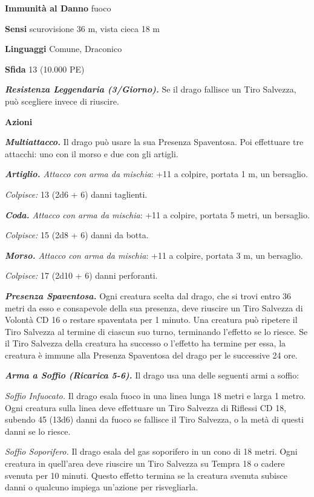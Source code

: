 \begin{multicols}{2}
\textbf{Immunità al Danno} fuoco

\textbf{Sensi} scurovisione 36 m, vista cieca 18 m 

\textbf{Linguaggi} Comune, Draconico

\textbf{Sfida} 13 (10.000 PE)

\emph{\textbf{Resistenza Leggendaria (3/Giorno).}} Se il drago fallisce un Tiro Salvezza, può scegliere invece di riuscire.

\textbf{Azioni}

\emph{\textbf{Multiattacco.}} Il drago può usare la sua Presenza Spaventosa. Poi effettuare tre attacchi: uno con il morso e due con gli artigli.

\emph{\textbf{Artiglio.} Attacco con arma da mischia}: +11 a colpire, portata 1 m, un bersaglio.

\emph{Colpisce:} 13 (2d6 + 6) danni taglienti.

\emph{\textbf{Coda.} Attacco con arma da mischia}: +11 a colpire, portata 5 metri, un bersaglio.

\emph{Colpisce:} 15 (2d8 + 6) danni da botta.

\emph{\textbf{Morso.} Attacco con arma da mischia}: +11 a colpire, portata 3 m, un bersaglio.

\emph{Colpisce:} 17 (2d10 + 6) danni perforanti.

\emph{\textbf{Presenza Spaventosa.}} Ogni creatura scelta dal drago, che si trovi entro 36 metri da esso e consapevole della sua presenza, deve riuscire un Tiro Salvezza di Volontà CD 16 o restare spaventata per 1 minuto. Una creatura può ripetere il Tiro Salvezza al termine di ciascun suo turno, terminando l'effetto se lo riesce. Se il Tiro Salvezza della creatura ha successo o l'effetto ha termine per essa, la creatura è immune alla Presenza Spaventosa del drago per le successive 24 ore.

\emph{\textbf{Arma a Soffio (Ricarica 5-6).}} Il drago usa una delle seguenti armi a soffio:

\emph{Soffio Infuocato.} Il drago esala fuoco in una linea lunga 18 metri e larga 1 metro. Ogni creatura sulla linea deve effettuare un Tiro Salvezza di Riflessi CD 18, subendo 45 (13d6) danni da fuoco se fallisce il Tiro Salvezza, o la metà di questi danni se lo riesce. 

\emph{Soffio Soporifero.} Il drago esala del gas soporifero in un cono di 18 metri. Ogni creatura in quell'area deve riuscire un Tiro Salvezza su Tempra 18 o cadere svenuta per 10 minuti. Questo effetto termina se la creatura svenuta subisce danni o qualcuno impiega un'azione per risvegliarla.


\end{multicols}
